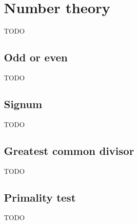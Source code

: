 \chapter{Number theory}
\label{chap:Number theory}

TODO

\vspace{1cm}
\minitoc


\newpage
\section{Odd or even}
\label{sec:Odd or even}

TODO %


\newpage
\section{Signum}
\label{sec:Signum}

TODO %


\newpage
\section{Greatest common divisor}
\label{sec:Greatest common divisor}

TODO %


\newpage
\section{Primality test}
\label{sec:Primality test}

TODO %
